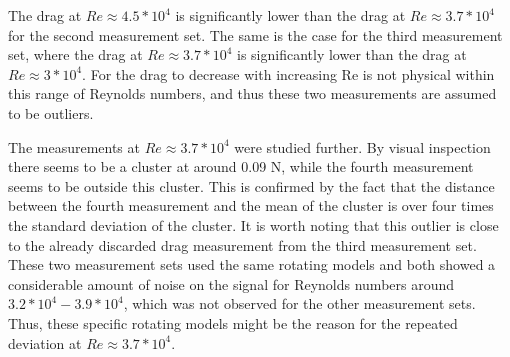 The drag at $Re \approx 4.5*10^4$ is significantly lower than the drag at $Re \approx 3.7*10^4$ for the second measurement set. The same is the case for the third measurement set, where the drag at $Re \approx 3.7*10^4$ is significantly lower than the drag at $Re \approx 3*10^4$. For the drag to decrease with increasing Re is not physical within this range of Reynolds numbers, and thus these two measurements are assumed to be outliers. 

The measurements at $Re \approx 3.7*10^4$ were studied further. By visual inspection there seems to be a cluster at around 0.09 \si{\N}, while the fourth measurement seems to be outside this cluster. This is confirmed by the fact that the distance between the fourth measurement and the mean of the cluster is over four times the standard deviation of the cluster. It is worth noting that this outlier is close to the already discarded drag measurement from the third measurement set. These two measurement sets used the same rotating models and both showed a considerable amount of noise on the signal for Reynolds numbers around $3.2*10^4-3.9*10^4$, which was not observed for the other measurement sets. Thus, these specific rotating models might be the reason for the repeated deviation at $Re \approx 3.7*10^4$.  





